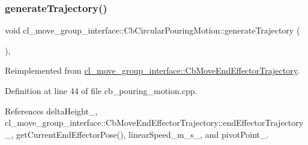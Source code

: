 \mbox{\label{classcl__move__group__interface_1_1CbCircularPouringMotion_a9150bb3731082aad3af2d7d6e067a344}} 
\subsubsection{\texorpdfstring{generate\+Trajectory()}{generateTrajectory()}}
{\footnotesize\ttfamily void cl\+\_\+move\+\_\+group\+\_\+interface\+::\+Cb\+Circular\+Pouring\+Motion\+::generate\+Trajectory (\begin{DoxyParamCaption}{ }\end{DoxyParamCaption})\hspace{0.3cm}{\ttfamily [override]}, {\ttfamily [virtual]}}



Reimplemented from \hyperlink{classcl__move__group__interface_1_1CbMoveEndEffectorTrajectory_aeae938ab66e18ab7d2fb2427bc83647b}{cl\+\_\+move\+\_\+group\+\_\+interface\+::\+Cb\+Move\+End\+Effector\+Trajectory}.



Definition at line 44 of file cb\+\_\+pouring\+\_\+motion.\+cpp.



References delta\+Height\+\_\+, cl\+\_\+move\+\_\+group\+\_\+interface\+::\+Cb\+Move\+End\+Effector\+Trajectory\+::end\+Effector\+Trajectory\+\_\+, get\+Current\+End\+Effector\+Pose(), linear\+Speed\+\_\+m\+\_\+s\+\_\+, and pivot\+Point\+\_\+.


